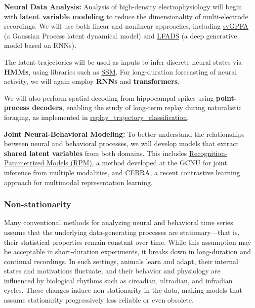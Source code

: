 \vspace{1em}
\noindent\textbf{Neural Data Analysis:}  
Analysis of high-density electrophysiology will begin with \textbf{latent
variable modeling} to reduce the dimensionality of multi-electrode recordings.
We will use both linear and nonlinear approaches, including
\href{https://github.com/joacorapela/svGPFA}{svGPFA} (a Gaussian Process latent
dynamical model) and \href{https://snel.ai/resources/lfads/}{LFADS} (a deep
generative model based on RNNs).

The latent trajectories will be used as inputs to infer discrete neural states
via \textbf{HMMs}, using libraries such as
\href{https://github.com/lindermanlab/ssm}{SSM}. For long-duration forecasting
of neural activity, we will again employ \textbf{RNNs} and
\textbf{transformers}.

We will also perform spatial decoding from hippocampal spikes using
\textbf{point-process decoders}, enabling the study of long-term replay during
naturalistic foraging, as implemented in
\href{https://github.com/Eden-Kramer-Lab/replay_trajectory_classification}{replay\_trajectory\_classification}.

\vspace{1em}
\noindent\textbf{Joint Neural-Behavioral Modeling:}  
To better understand the relationships between neural and behavioral processes,
we will develop models that extract \textbf{shared latent variables} from both
domains. This includes
\href{https://github.com/gatsby-sahani/rpm-aistats-2023}{Recognition-Parametrized
Models (RPM)}, a method developed at the GCNU for joint inference from multiple
modalities, and \href{https://cebra.ai/}{CEBRA}, a recent contrastive learning
approach for multimodal representation learning.

\subsubsection*{Non-stationarity}

Many conventional methods for analyzing neural and behavioral time series
assume that the underlying data-generating processes are stationary—that is,
their statistical properties remain constant over time. While this assumption
may be acceptable in short-duration experiments, it breaks down in
long-duration and continual recordings. In such settings, animals
learn and adapt, their internal states and motivations fluctuate, and their
behavior and physiology are influenced by biological rhythms such as circadian,
ultradian, and infradian cycles. These changes induce non-stationarity in the
data, making models that assume stationarity progressively less reliable or
even obsolete.

